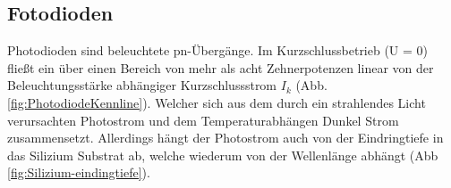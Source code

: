 
\subsection{Fotodioden}
Photodioden sind beleuchtete pn-Übergänge. Im Kurzschlussbetrieb (U = 0) fließt ein über einen Bereich von mehr als acht Zehnerpotenzen linear von der Beleuchtungsstärke abhängiger Kurzschlussstrom $I_k$ (Abb. \ref{fig:PhotodiodeKennline}).
Welcher sich aus dem durch ein strahlendes Licht verursachten Photostrom und dem Temperaturabhängen Dunkel Strom zusammensetzt.
Allerdings hängt der Photostrom auch von der Eindringtiefe in das Silizium Substrat ab, welche wiederum von der Wellenlänge abhängt (Abb \ref{fig:Silizium-eindingtiefe}).\\



